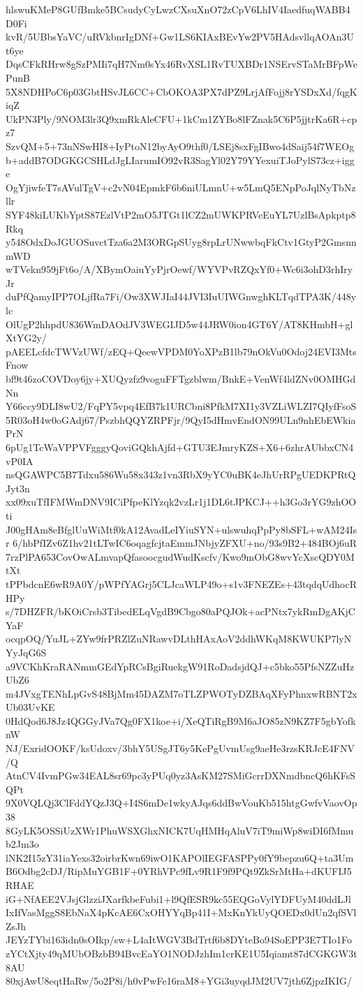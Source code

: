 hlswuKMeP8GUfBmke5BCsudyCyLwzCXsuXnO72zCpV6LhIV4IaedfuqWABB4D0Fi
kvR/5UBbsYaVC/uRVkbnrIgDNf+Gw1LS6KIAxBEvYw2PV5HAdsvllqAOAn3Ut6ye
DqsCFkRHrw8gSzPMIi7qH7Nm0sYx46RvXSL1RvTUXBDr1NSErvSTaMrBFpWePunB
5X8NDHPoC6p03GbtHSvJL6CC+CbOKOA3PX7dPZ9LrjAfFojj8rYSDxXd/fqgKiqZ
UkPN3Ply/9NOM3lr3Q9xmRkAleCFU+1kCm1ZYBo8lFZnak5C6P5jjtrKa6R+cpz7
SzvQM+5+73nNSwHI8+IyPtoN12byAyO9thf0/LSEj8sxFgIBwo4dSaij54f7WEOg
b+addB7ODGKGCSHLdJgLIarumIO92vR3SagYl02Y79YYexuiTJoPylS73cz+igge
OgYjiwfeT7sAVulTgV+c2vN04EpmkF6b6niULmnU+w5LmQ5ENpPoJqlNyTbNzllr
SYF48kiLUKbYptS87EzlVtP2mO5JTGt1lCZ2mUWKPRVeEuYL7UzlBsApkptp8Rkq
y548OdxDoJGUOSuvctTza6a2M3ORGpSUyg8rpLrUNwwbqFkCtv1GtyP2GmsnnmWD
wTVekn959jFt6o/A/XBymOaiuYyPjrOewf/WYVPvRZQxYf0+Wc6i3ohD3rhIryJr
duPfQamyIPP7OLjfRa7Fi/Ow3XWJIaI44JVI3IuUIWGnwghKLTqdTPA3K/448ylc
OlUgP2hhpdU836WmDAOdJV3WEGIJD5w44JRW0ion4GT6Y/AT8KHmbH+glXtYG2y/
pAEELcfdcTWVzUWf/zEQ+QeewVPDM0YoXPzB1lb79nOkVu0Odoj24EVI3MtsFnow
bf9t46zoCOVDoy6jy+XUQyzfz9voguFFTgzblwm/BnkE+VenWf4ldZNv0OMHGdNn
Y66ccy9DLI8wU2/FqPY5vpq4EfB7k1URCbni8PfkM7XI1y3VZLiWLZI7QIyfFsoS
5R03oH4w0oGAdj67/PszbhQQYZRPFjr/9QyI5dHmvEndON99ULn9nhEbEWkiaPrN
6pUg1TcWaVPPVFgggyQoviGQkhAjfd+GTU3EJmryKZS+X6+6zhrAUbbxCN4vP0IA
nsQGAWPC5B7Tdxu586Wu58x343z1vn3RbX9yYC0uBK4eJhUrRPgUEDKPRtQJyt3n
xx09xuTfIFMWmDNV9ICiPfpeKlYzqk2vzLr1j1DL6tJPKCJ++h3Go3rYG9zhOOti
J00gHAm8eBfglUuWiMtf0kA12AvadLeIYiuSYN+ulswuhqPpPy8bSFL+wAM24Isr
6/hbPfIZv6Z1hv21tLTwIC6oqagfcjtaEmmJNbjyZFXU+no/93s9B2+484BOj6uR
7rzPlPA653CovOwALmvapQfasoocgudWudKscfv/Kwo9mObG8wvYcXscQDY0MtXt
tPPbdcnE6wR9A0Y/pWPfYAGrj5CLJcaWLP49o+s1v3FNEZEs+43tqdqUdhocRHPy
s/7DHZFR/bKOiCrsb3TibedELqVgdB9Cbgo80aPQJOk+acPNtx7ykRmDgAKjCYaF
ocqpOQ/YuJL+ZYw9frPRZlZuNRawvDLthHAxAoV2ddhWKqM8KWUKP7lyNYyJqG6S
a9VCKhKraRANmmGEdYpRCsBgiRuekgW91RoDadsjdQJ+c5bko55PfsNZZuHzUbZ6
m4JVxgTENhLpGvS48BjMm45DAZM7oTLZPWOTyDZBAqXFyPhnxwRBNT2xUb03UvKE
0HdQod6J8Jz4QGGyJVa7Qg0FX1koe+i/XeQTiRgB9M6aJO85zN9KZ7F5gbYofknW
NJ/ExridOOKF/ksUdoxv/3bhY5USgJT6y5KePgUvmUsg9aeHe3rzsKRJcE4FNV/Q
AtnCV4IvmPGw34EAL8sr69pc3yPUq0yz3AsKM27SMiGcrrDXNmdbncQ6hKFsSQPt
9X0VQLQj3ClFddYQzJ3Q+I4S6mDe1wkyAJqs6ddBwVouKb515htgGwfvVaovOp38
8GyLK5OSSiUzXWr1PhuWSXGhxNICK7UqHMHqAluV7iT9miWp8wiDI6fMmub2Jm3o
lNK2I15zY31iaYexs32oirbrKwn69iwO1KAPOlIEGFASPPy0fY9bepzu6Q+ta3Um
B6Odbg2cDJ/RipMuYGB1F+0YRhVPc9fLv9R1F9f9PQt9ZkSrMtHa+dKUFIJ5RHAE
iG+NfAEE2VJsjGlzziJXarfkbeFubi1+l9QfESR9kc55EQGoVylYDFUyM40ddLJl
IxIfVasMggS8EbNaX4pKcAE6CxOHYYqBp41I+MxKnYkUyQOEDx0dUn2qfSVlZsJh
JEYzTYbi163idn0sOIkp/sw+L4aItWGV3BdTrtf6b8DYteBo94SoEPP3E7TIo1Fo
zYCtXjty49qMUbOBzbB94BvcEaYO1NODJzhIm1crKE1U5Iqiamt87dCGKGW3t8AU
80xjAwU8eqtHaRw/5o2P8i/h0vPwFe16raM8+YGi3uyqdJM2UV7jth6ZjpzIKIG/
